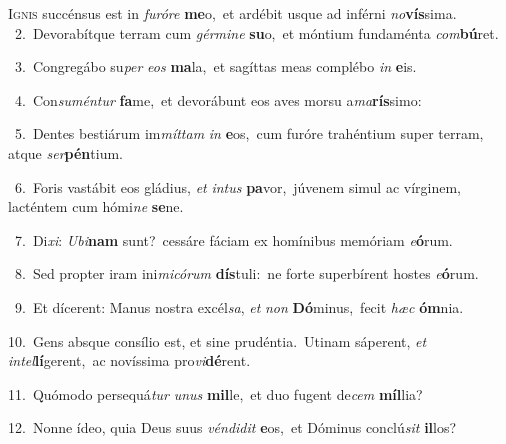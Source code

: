 \lettrine{\initial\textcolor{\initialcolor}{I}}{gnis} succénsus est in \textit{fu}\-\textit{ró}\textit{re} \textbf{me}\-o,~\star et ardébit usque ad inférni \textit{no}\-\textbf{vís}sima.\\
{\numbfont\textcolor{\numbcolor}{~2.}}~Devorabítque terram cum \textit{gér}\-\textit{mi}\textit{ne} \textbf{su}\-o,~\star et móntium fundaménta \textit{com}\-\textbf{bú}ret.\par
{\numbfont\textcolor{\numbcolor}{~3.}}~Congregábo su\textit{per} \textit{e}\-\textit{os} \textbf{ma}\-la,~\star et sagíttas meas complébo \textit{in} \textbf{e}\-is.\par
{\numbfont\textcolor{\numbcolor}{~4.}}~Con\-\textit{su}\-\textit{mén}\textit{tur} \textbf{fa}\-me,~\star et devorábunt eos aves morsu a\-\textit{ma}\-\textbf{rís}simo:\par
{\numbfont\textcolor{\numbcolor}{~5.}}~Dentes bestiárum im\-\textit{mít}\-\textit{tam} \textit{in} \textbf{e}\-os,~\star cum furóre trahéntium super terram, atque \textit{ser}\-\textbf{pén}tium.\par
{\numbfont\textcolor{\numbcolor}{~6.}}~Foris vastábit eos gládius, \textit{et} \textit{in}\-\textit{tus} \textbf{pa}\-vor,~\star júvenem simul ac vírginem, lacténtem cum hómi\textit{ne} \textbf{se}\-ne.\par
{\numbfont\textcolor{\numbcolor}{~7.}}~Di\-\textit{xi}\-: \textit{U}\-\textit{bi}\textbf{nam} sunt?~\star cessáre fáciam ex homínibus memóriam \textit{e}\-\textbf{ó}rum.\par
{\numbfont\textcolor{\numbcolor}{~8.}}~Sed propter iram ini\-\textit{mi}\-\textit{có}\textit{rum} \textbf{dís}\-tuli:~\star ne forte superbírent hostes \textit{e}\-\textbf{ó}rum.\par
{\numbfont\textcolor{\numbcolor}{~9.}}~Et dícerent: Manus nostra excél\-\textit{sa}\-, \textit{et} \textit{non} \textbf{Dó}\-minus,~\star fecit \textit{hæc} \textbf{óm}\-nia.\par
{\numbfont\textcolor{\numbcolor}{10.}}~Gens absque consílio est, et sine prudéntia.~\dagger Utinam sáperent, \textit{et} \textit{in}\-\textit{tel}\textbf{lí}gerent,~\star ac novíssima pro\-\textit{vi}\-\textbf{dé}rent.\par
{\numbfont\textcolor{\numbcolor}{11.}}~Quómodo persequá\textit{tur} \textit{u}\-\textit{nus} \textbf{mil}\-le,~\star et duo fugent de\textit{cem} \textbf{míl}\-lia?\par
{\numbfont\textcolor{\numbcolor}{12.}}~Nonne ídeo, quia Deus suus \textit{vén}\-\textit{di}\textit{dit} \textbf{e}\-os,~\star et Dóminus conclú\textit{sit} \textbf{il}\-los?\par
